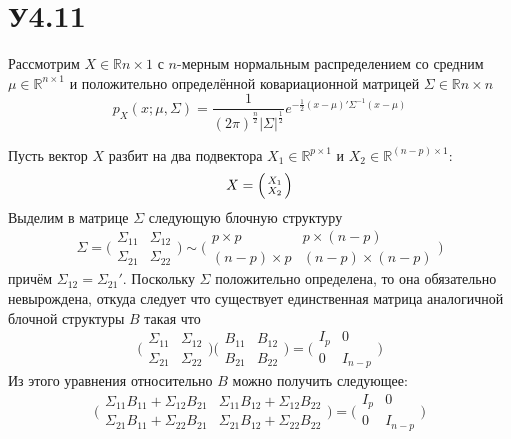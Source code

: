 \documentclass[a4paper]{article}
\newcommand{\Real}{\mathbb{R}}
\begin{document}
\section{У4.11} %
\label{sec:problem_4_11}

Рассмотрим $X\in \Real{n\times 1}$ с $n$-мерным нормальным распределением со
средним $\mu\in \Real^{n\times 1}$ и положительно определённой ковариационной
матрицей $\Sigma \in \Real{n\times n}$
\[
p_X(x;\mu,\Sigma)
= \frac{1}{(2\pi)^\frac{n}{2} \lvert \Sigma \rvert^\frac{1}{2}}
	e^{-\frac{1}{2}(x-\mu)'\Sigma^{-1}(x-\mu)}
\]

Пусть вектор $X$ разбит на два подвектора $X_1\in \Real^{p\times 1}$ и $X_2\in \Real^{(n-p)\times 1}$:
\[X = \Bigl(\begin{smallmatrix} X_1 \\ X_2 \end{smallmatrix}\Bigr)\]
Выделим в матрице $\Sigma$ следующую блочную структуру
\[
\Sigma
= \biggl(\begin{matrix}\Sigma_{11} & \Sigma_{12}\\\Sigma_{21} & \Sigma_{22}\end{matrix}\biggr)
\sim \biggl(\begin{matrix}p\times p & p\times (n-p)\\(n-p)\times p & (n-p)\times (n-p)\end{matrix}\biggr)
\]
причём $\Sigma_{12} = \Sigma_{21}'$. Поскольку $\Sigma$ положительно определена,
то она обязательно невырождена, откуда следует что существует единственная матрица
аналогичной блочной структуры $B$ такая что
\[
\biggl(\begin{matrix}\Sigma_{11} & \Sigma_{12}\\\Sigma_{21} & \Sigma_{22}\end{matrix}\biggr)
\biggl(\begin{matrix}B_{11} & B_{12}\\B_{21} & B_{22}\end{matrix}\biggr)
=
\biggl(\begin{matrix}I_p & 0\\0 & I_{n-p}\end{matrix}\biggr)
\]
Из этого уравнения относительно $B$ можно получить следующее:
\[
\biggl(\begin{matrix}
\Sigma_{11}B_{11} + \Sigma_{12}B_{21} & \Sigma_{11}B_{12} + \Sigma_{12}B_{22} \\
\Sigma_{21}B_{11} + \Sigma_{22}B_{21} & \Sigma_{21}B_{12} + \Sigma_{22}B_{22}
\end{matrix}\biggr)
= \biggl(\begin{matrix}I_p & 0\\0 & I_{n-p}\end{matrix}\biggr)
\]
\end{document}
